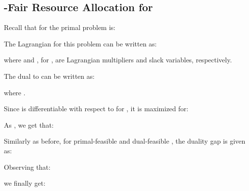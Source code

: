 \documentclass[11pt]{article}
\begin{document}
\subsection{-Fair Resource Allocation for }

Recall that for  the primal problem is:


The Lagrangian for this problem can be written as:

where  and , for , are Lagrangian multipliers and slack variables, respectively.

The dual to  can be written as:

where .

Since  is differentiable with respect to  for , it is maximized for:

As  , we get that:


Similarly as before, for primal-feasible  and dual-feasible , the duality gap is given as:

Observing that:

we finally get:








































\fi
\end{document}

